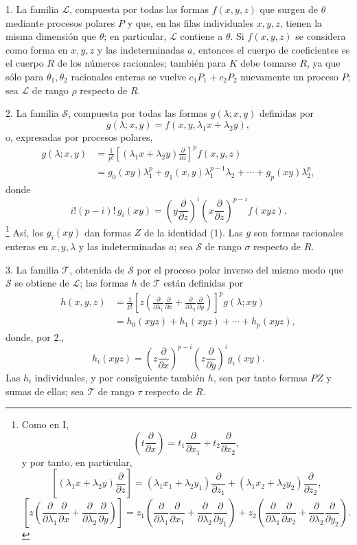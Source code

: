 \documentclass[11pt]{article}
\begin{document}
1. La familia $\mathcal L$, compuesta por todas las formas $f(x,y,z)$ que surgen de $\theta$ mediante procesos polares $P$ y que, en las filas individuales $x,y,z$, tienen la misma dimensión que $\theta$; en particular, $\mathcal L$ contiene a $\theta$. Si $f(x,y,z)$ se considera como forma en $x,y,z$ y las indeterminadas $a$, entonces el cuerpo de coeficientes es el cuerpo $R$ de los números racionales; también para $K$ debe tomarse $R$, ya que sólo para $\theta_1,\theta_2$ racionales enteras se vuelve $c_1P_1+c_2P_2$ nuevamente un proceso $P$; sea $\mathcal L$ de rango $\rho$ respecto de $R$.

2. La familia $\mathcal S$, compuesta por todas las formas $g(\lambda;x,y)$ definidas por
\[
  g(\lambda;x,y)=f(x,y,\lambda_1x+\lambda_2y),
\]
o, expresadas por procesos polares,
\[
\begin{aligned}
  g(\lambda;x,y)
  &=\frac1{p!}\left[(\lambda_1x+\lambda_2y)\frac{\partial}{\partial z}\right]^p f(x,y,z) \\
  &=g_0(xy)\lambda_1^p+g_1(x,y)\lambda_1^{p-1}\lambda_2+\cdots+g_p(xy)\lambda_2^p,
\end{aligned}
\]
donde
\[
  i!(p-i)!\,g_i(xy)=
  \left(y\frac{\partial}{\partial z}\right)^i
  \left(x\frac{\partial}{\partial z}\right)^{p-i}f(xyz).
\]
\footnote{Como en I,
\[
 \left(t\frac{\partial}{\partial x}\right)=t_1\frac{\partial}{\partial x_1}+t_2\frac{\partial}{\partial x_2},
\]
y por tanto, en particular,
\[
 \left[(\lambda_1x+\lambda_2y)\frac{\partial}{\partial z}\right]
 = (\lambda_1x_1+\lambda_2y_1)\frac{\partial}{\partial z_1}
 + (\lambda_1x_2+\lambda_2y_2)\frac{\partial}{\partial z_2},
\]
\[
 \left[z\left(\frac{\partial}{\partial\lambda_1}\frac{\partial}{\partial x}
 +\frac{\partial}{\partial\lambda_2}\frac{\partial}{\partial y}\right)\right]
 =z_1\left(\frac{\partial}{\partial\lambda_1}\frac{\partial}{\partial x_1}
 +\frac{\partial}{\partial\lambda_2}\frac{\partial}{\partial y_1}\right)
 +z_2\left(\frac{\partial}{\partial\lambda_1}\frac{\partial}{\partial x_2}
 +\frac{\partial}{\partial\lambda_2}\frac{\partial}{\partial y_2}\right).
\]}
Así, los $g_i(xy)$ dan formas $Z$ de la identidad (1). Las $g$ son formas racionales enteras en $x,y,\lambda$ y las indeterminadas $a$; sea $\mathcal S$ de rango $\sigma$ respecto de $R$.

3. La familia $\mathcal T$, obtenida de $\mathcal S$ por el proceso polar inverso del mismo modo que $\mathcal S$ se obtiene de $\mathcal L$; las formas $h$ de $\mathcal T$ están definidas por
\[
\begin{aligned}
 h(x,y,z)
 &=\frac1{p!}\left[z\left(\frac{\partial}{\partial\lambda_1}\frac{\partial}{\partial x}
 +\frac{\partial}{\partial\lambda_2}\frac{\partial}{\partial y}\right)\right]^p g(\lambda;xy)\\
 &=h_0(xyz)+h_1(xyz)+\cdots+h_p(xyz),
\end{aligned}
\]
donde, por 2.,
\[
  h_i(xyz)=
  \left(z\frac{\partial}{\partial x}\right)^{p-i}
  \left(z\frac{\partial}{\partial y}\right)^i g_i(xy).
\]
Las $h_i$ individuales, y por consiguiente también $h$, son por tanto formas $PZ$ y sumas de ellas; sea $\mathcal T$ de rango $\tau$ respecto de $R$.
\end{document}
